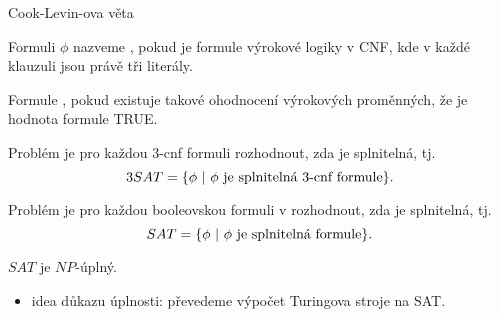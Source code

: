     \begin{frame}{Cook-Levin-ova věta}
    \begin{definition}
    Formuli $\phi$ nazveme , pokud je formule výrokové logiky v CNF, kde v každé klauzuli jsou právě tři literály.
    
    Formule , pokud existuje takové ohodnocení výrokových proměnných, že je hodnota formule TRUE.
    
    Problém  je pro každou 3-cnf formuli rozhodnout, zda je splnitelná, tj.
    $$3SAT=\{\phi \ |\  \phi \hbox{ je splnitelná 3-cnf formule}\}\hbox{.}
    $$
    
    Problém  je pro každou booleovskou formuli v rozhodnout, zda je splnitelná, tj.
    $$SAT=\{\phi \ |\  \phi \hbox{ je splnitelná formule}\}\hbox{.}
    $$
    \end{definition}
    
    \begin{theorem}
    $SAT$ je $NP$-úplný.
    \end{theorem}
    \begin{itemize}
        \item idea důkazu úplnosti: převedeme výpočet Turingova stroje na SAT.
    \end{itemize}
    \end{frame}
    
